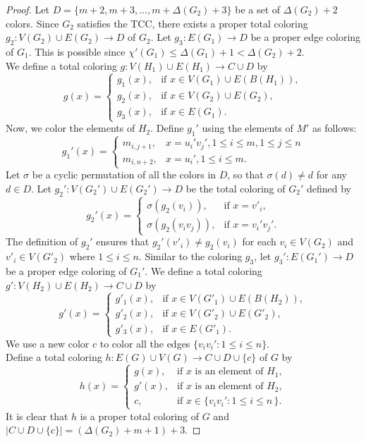 \documentclass[10pt,a4paper]{amsart}
\begin{document}
\begin{proof}
Let $D=\{m+2, m+3,...,m+\Delta(G_{2})+3\}$ be a set of $\Delta(G_2)+2$ colors.
Since $G_2$ satisfies the TCC, there exists a proper total coloring $g_2:V(G_2)\cup E(G_2)\rightarrow D$ of $G_2$.
Let $g_3:E(G_1)\rightarrow D$ be a proper edge coloring of $G_1$. This is possible since $\chi'(G_1)\leq \Delta(G_1)+1<\Delta(G_2)+2$.\\
We define a total coloring
$g:V(H_1)\cup E(H_1)\rightarrow C\cup D$ by
\[
g(x)=
\begin{cases}
g_1(x), & \text{if } x\in V(G_1)\cup E(B(H_1)),\\
g_2(x), & \text{if } x\in V(G_2)\cup E(G_2),\\
g_3(x), & \text{if } x\in E(G_1).
\end{cases}
\]
Now, we color the elements of $H_2$.
Define $g_1'$ using the elements of $M'$ as follows:
\[
g_1'(x)=
\begin{cases}
m_{i,j+1}, & x=u_i'v_j', 1\leq i\leq m, 1\leq j\leq n\\[2mm]
m_{i,n+2}, & x=u_i', 1\leq i\leq m.
\end{cases}
\]
Let $\sigma$ be a cyclic permutation of all the colors in $D$, so that $\sigma(d)\neq d$ for any $d\in D$. 
Let $g_2':V(G_2')\cup E(G_2')\rightarrow D$ be the total coloring of $G_2'$  defined by 
\[
g_2'(x)=
\begin{cases}
\sigma(g_2(v_i)), & \text{if }x=v'_i,\\[1mm]
\sigma(g_2(v_iv_j)), & \text{if }x=v_i'v_j'.
\end{cases}
\]
The definition of $g_2'$ ensures that $g_2'(v'_i)\neq g_2(v_i)$ for each $v_i\in V(G_2)$ and $v'_i\in V(G'_2)$ where $1\leq i\leq n$.
Similar to the coloring $g_3$, let $g_3': E(G_1')\rightarrow D$ be a proper edge coloring  of $G_1'$. 
We define a total coloring
$g':V(H_2)\cup E(H_2)\rightarrow C\cup D$ by
\[
g'(x)=
\begin{cases}
g'_1(x), & \text{if } x\in V(G'_1)\cup E(B(H_2)),\\
g'_2(x), & \text{if } x\in V(G'_2)\cup E(G'_2),\\
g'_3(x), & \text{if } x\in E(G'_1).
\end{cases}
\]
We use a new color $c$ to color all the edges $\{v_iv_i':1\le i\leq n\}$.\\
Define a total coloring $h : E(G)\cup V(G)\rightarrow C \cup D \cup \{c\}$ of $G$ by
\[h(x)=
\begin{cases}
g(x), & \text{if } x \text{ is an element of } H_1,\\[1ex]
g'(x), & \text{if } x \text{ is an element of } H_2,\\[1ex]
c, & \text{if } x \in \{v_iv_i' : 1 \leq i \leq n\,\}.
\end{cases}
\]
It is clear that \(h\) is a proper total coloring of $G$ and $|C\cup D\cup \{c\}|=\left(\Delta(G_2)+m+1\right)+3$.


\end{proof}
\end{document}
